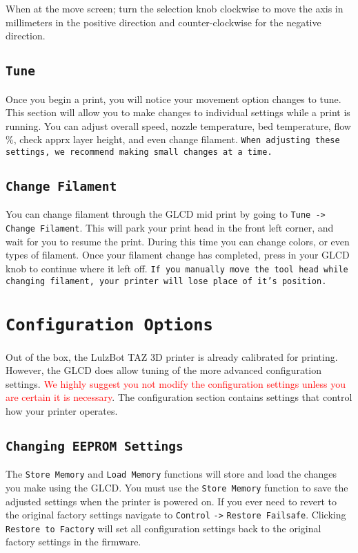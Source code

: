When at the move screen; turn the selection knob clockwise to move the axis in millimeters in the positive direction and counter-clockwise for the negative direction. 

\subsection{\texttt{Tune}}
Once you begin a print, you will notice your movement option changes to tune. This section will allow you to make changes to individual settings while a print is running. You can adjust overall speed, nozzle temperature, bed temperature, flow \%, check apprx layer height, and even change filament. \texttt{When adjusting these settings, we recommend making small changes at a time.}

\subsection{\texttt{Change Filament}}
You can change filament through the GLCD mid print by going to \texttt{Tune -> Change Filament}. This will park your print head in the front left corner, and wait for you to resume the print. During this time you can change colors, or even types of filament. Once your filament change has completed, press in your GLCD knob to continue where it left off. \texttt{If you manually move the tool head while changing filament, your printer will lose place of it's position.}

\section{\texttt{Configuration Options}} 


Out of the box, the LulzBot TAZ 3D printer is already calibrated for printing. However, the GLCD does allow tuning of the more advanced configuration settings. \textcolor{red}{We highly suggest you not modify the configuration settings unless you are certain it is necessary}. The configuration section contains settings that control how your printer operates.

\subsection{\texttt{Changing EEPROM Settings}}
The \texttt{Store Memory} and \texttt{Load Memory} functions will store and load the changes you make using the GLCD. You must use the \texttt{Store Memory} function to save the adjusted settings when the printer is powered on. If you ever need to revert to the original factory settings navigate to \texttt{Control} \texttt{->} \texttt{Restore Failsafe}. Clicking \texttt{Restore to Factory} will set all configuration settings back to the original factory settings in the firmware.

